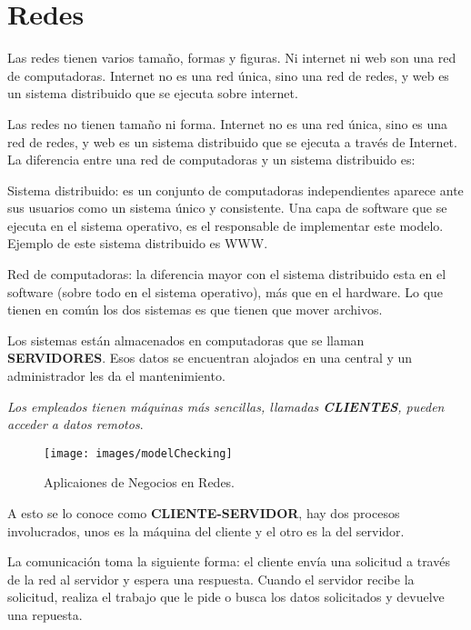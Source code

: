 \documentclass[12pt]{report}
\begin{document}
\section*{Redes}

Las redes tienen varios tama\~no, formas y figuras. Ni internet ni web son una red de computadoras. Internet no es una red \'unica, sino una red de redes, y web es un  sistema distribuido que se ejecuta sobre internet.



Las redes no tienen tama\~no ni forma. Internet no es una red \'unica, sino es una red de redes, y web es un sistema distribuido que se ejecuta a trav\'es de Internet.
La diferencia entre una red de computadoras y un sistema distribuido es:


Sistema distribuido: es un conjunto de computadoras independientes aparece ante 
sus usuarios como un sistema \'unico y consistente. Una capa de software que se ejecuta en el sistema operativo, es el responsable de implementar este modelo. Ejemplo de este sistema distribuido es WWW.     

Red de computadoras: la diferencia mayor con el sistema distribuido esta en el software (sobre todo en el sistema operativo), más que en el hardware. Lo que tienen en común los dos sistemas es que tienen que mover archivos.


Los sistemas están almacenados en computadoras que se llaman {\bf SERVIDORES}. Esos datos se encuentran alojados en una central y un administrador les da el mantenimiento.

\textit {Los empleados tienen m\'aquinas m\'as sencillas, llamadas {\bf CLIENTES},  pueden acceder a datos remotos}.

\begin{figure}[!h]
\texttt{[image: images/modelChecking]}
\caption{Aplicaiones de Negocios en Redes.}
\label{modelchecking-IO}
\end{figure}

A esto se lo conoce como {\bf CLIENTE-SERVIDOR}, hay dos procesos involucrados, unos es la m\'aquina del cliente y el otro es la del servidor.

La comunicaci\'on toma la siguiente forma: el cliente env\'ia una solicitud a trav\'es de la red al servidor y espera una respuesta. Cuando el servidor recibe la solicitud, realiza el trabajo  que le pide o busca los datos solicitados y devuelve una repuesta. 
\end{document}
